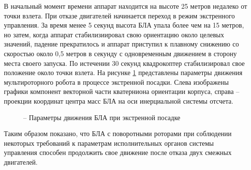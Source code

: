 В начальный момент времени аппарат находится на высоте 25 метров недалеко от точки взлета.
При отказе двигателей начинается переход в режим экстренного управления.
За время менее 5 секунд высота БЛА упала более чем на 15 метров, но затем, когда аппарат стабилизиировал свою ориентацию около целевых значений, падение прекратилось и аппарат приступил к плавному снижению со скоростью около 0,5 метров в секунду с одновременным движением в сторону места своего запуска. По истечении 30 секунд квадрокоптер стабилизировал свое положение около точки взлета. На рисунке \ref{fig:em_coords} представлены параметры движения мультироторного робота в процессе экстренной посадки. Слева изображены графики компонент векторной части кватерниона ориентации корпуса, справа -- проекции координат центра масс БЛА на оси инерциальной системы отсчета.
\begin{figure}[H]
	
	\centering
	\hfil
	\subfloat[коордиата x]{\texttt{[image: em/x]}}
	
	 \hfil 
	\subfloat[коордиата y]{\texttt{[image: em/y]}}  
	
	\hfil
	\subfloat[коордиата z]{\texttt{[image: em/z]}}
	\caption{ -- Параметры движения БЛА при экстренной посадке}
	\label{fig:em_coords}
\end{figure}

Таким образом показано, что БЛА с поворотными роторами при соблюдении некоторых требований к параметрам исполнительных органов системы управления способен продолжить свое движение после отказа двух смежных двигателей.